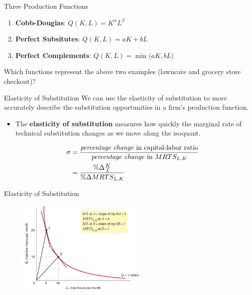\documentclass[11pt,t]{beamer}
\begin{document}
\begin{frame}{Three Production Functions}
  \begin{enumerate}
    \item \textbf{Cobb-Douglas}: $Q(K,L) = K^\alpha L^\beta$
    
    \item \textbf{Perfect Subsitutes}: $Q(K,L) = aK + bL$
    
    \item \textbf{Perfect Complements}: $Q(K,L) = \min\big(aK, bL\big)$
  \end{enumerate}
  
  \pause\bigskip
  Which functions represent the above two examples (lawncare and grocery store checkout)?
\end{frame}

\begin{frame}{Elasticity of Substitution}
  We can use the elasticity of substitution to more accurately describe the substitution opportunities in a firm's production function.
  
  \bigskip
  \begin{itemize}
    \item The \textbf{elasticity of substitution} measures how quickly the marginal rate of technical substitution changes as we move along the isoquant.
    
    \begin{align*}
      \sigma & = \frac{\text{\textit{percentage change} in capital-labor ratio}}{\text{\textit{percentage change} in }MRTS_{L,K}} \\
      & = \frac{\% \Delta \frac{K}{L}}{\% \Delta MRTS_{L,K}}
    \end{align*}
  \end{itemize}
\end{frame}

\begin{frame}{Elasticity of Substitution}
  \begin{figure}
    \includegraphics[width=240px]{figures/fig6_12.jpg}
  \end{figure}
\end{frame}
\end{document}
